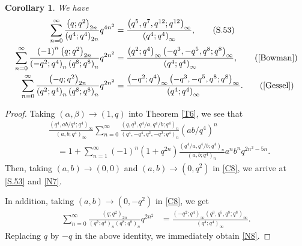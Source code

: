 \documentclass[reqno,12pt]{amsart}
\newtheorem{corollary}[theorem]{Corollary}
\theoremstyle{remark}
\numberwithin{equation}{section}
\begin{document}
\begin{corollary}
We have
\begin{align}
\sum_{n=0}^{\infty}\frac{\left(q;q^2\right)_{2n}}
{\left(q^4;q^4\right)_{2n}}q^{4n^2}
&=\frac{\left(q^5,q^7,q^{12};q^{12}\right)_{\infty}}
{\left(q^4;q^4\right)_{\infty}},\tag{S.53}
\label{S.53}\\
\sum_{n=0}^{\infty}\frac{\left(-1\right)^n\left(q;q^2\right)_{2n}}
{\left(-q^2;q^4\right)_{n}\left(q^8;q^8\right)_{n}}q^{2n^2}
&=\frac{\left(q^2;q^4\right)_{\infty}\left(-q^3,-q^5,q^{8};q^{8}\right)_{\infty}}
{\left(q^4;q^4\right)_{\infty}},\tag{\cite[Eq. (2.7)]{Bowman}}\label{N7}\\
\sum_{n=0}^{\infty}\frac{\left(-q;q^2\right)_{2n}}
{\left(q^2;q^4\right)_{n}\left(q^8;q^8\right)_{n}}q^{2n^2}
&=\frac{\left(-q^2;q^4\right)_{\infty}\left(-q^3,-q^5,q^{8};q^{8}\right)_{\infty}}
{\left(q^4;q^4\right)_{\infty}}.\tag{\rm{\cite[Eq. (7.24)]{Gessel}}}\label{N8}
\end{align}
\end{corollary}

\begin{proof}
Taking $\left(\alpha,\beta\right)\to\left(1,q\right)$ into Theorem \ref{T6}, we see that
\begin{align}
&\frac{\left(q^4,ab/q^4;q^4\right)_{\infty}}{\left(a,b;q^4\right)_{\infty}}
\sum_{n=0}^{\infty}
\frac{\left(q,q^3,q^4/a,q^4/b;q^4\right)_n}{\left(q^4,-q^4,q^2,-q^2;q^4\right)_n}\left(ab/q^4\right)^n\nonumber\\
&\quad=1+\sum_{n=1}^{\infty}\left(-1\right)^n\left(1+q^{2n}\right)
\frac{\left(q^4/a,q^4/b;q^4\right)_n}{\left(a,b;q^4\right)_n}
a^nb^nq^{2n^2-5n}.\label{C8}
\end{align}
Then, taking $\left(a,b\right)\to\left(0,0\right)$ and $\left(a,b\right)\to\left(0,q^2\right)$ in \eqref{C8}, we arrive at  \eqref{S.53} and \ref{N7}.

In addition, taking $\left(a,b\right)\to\left(0,-q^2\right)$ in \eqref{C8}, we get
\begin{align*}
\sum_{n=0}^{\infty}\frac{\left(q;q^2\right)_{2n}}
{\left(q^2;q^4\right)_{n}\left(q^8;q^8\right)_{n}}q^{2n^2}
&=\frac{\left(-q^2;q^4\right)_{\infty}\left(q^3,q^5,q^{8};q^{8}\right)_{\infty}}
{\left(q^4;q^4\right)_{\infty}}.
\end{align*}
Replacing $q$ by $-q$ in the above identity, we immediately obtain \ref{N8}.
\end{proof}
\end{document}
